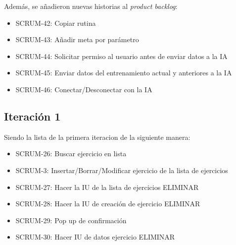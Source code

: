 Adem\'as, se a\~nadieron nuevas historias al \textit{product backlog}:

\begin{itemize}
  \item SCRUM-42: Copiar rutina
  \item SCRUM-43: Añadir meta por parámetro
  \item SCRUM-44: Solicitar permiso al usuario antes de enviar datos a la IA
  \item SCRUM-45: Enviar datos del entrenamiento actual y anteriores a la IA
  \item SCRUM-46: Conectar/Desconectar con la IA
\end{itemize}

\subsection{Iteraci\'on 1}
Siendo la lista de la primera iteracion de la siguiente manera:

\begin{itemize}
    \item SCRUM-26: Buscar ejercicio en lista
    \item SCRUM-3: Insertar/Borrar/Modificar ejercicio de la lista de ejercicios
    \item SCRUM-27: Hacer la IU de la lista de ejercicios ELIMINAR
    \item SCRUM-28: Hacer la IU de creación de ejercicio ELIMINAR
    \item SCRUM-29: Pop up de confirmación
    \item SCRUM-30: Hacer IU de datos ejercicio ELIMINAR
\end{itemize}

